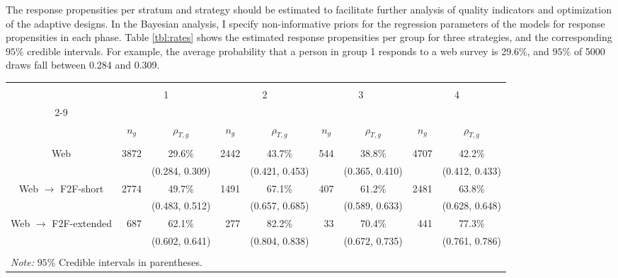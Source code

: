 \documentclass[11pt]{article}
\begin{document}
The response propensities per stratum and strategy should be estimated to facilitate further analysis of quality indicators and optimization of the adaptive designs. In the Bayesian analysis, I specify non-informative priors for the regression parameters of the models for response propensities in each phase. 
Table \ref{tbl:rates} shows the estimated response propensities per group for three strategies, and the corresponding $95\%$ credible intervals. For example, the average probability that a person in group 1 responds to a web survey is 29.6\%, and $95\%$ of 5000 draws fall between 0.284 and 0.309.

\begin{sidewaystable}
    \centering
    \caption{Estimated response propensities per stratum and strategy}
    \begin{tabular}{ccccccccc}
    \\ [-1.8ex] \hline
    \\[-1.8ex]
            & \multicolumn{2}{c}{1} & \multicolumn{2}{c}{2} & \multicolumn{2}{c}{3} & \multicolumn{2}{c}{4} \\
        \cline{2-9} \\ [-1.8ex]
        & $n_g$ & $\rho_{T,g}$ & $n_g$ & $\rho_{T,g}$ & $n_g$ & $\rho_{T,g}$ & $n_g$ & $\rho_{T,g}$ \\
        \hline \\[-1.8ex] 
        Web & \multicolumn{1}{r}{3872} & 29.6\% & \multicolumn{1}{r}{2442} & 43.7\% & \multicolumn{1}{r}{544} & 38.8\% & \multicolumn{1}{r}{4707} & 42.2\% \\
        & & (0.284, 0.309) & & (0.421, 0.453) & & (0.365, 0.410) & & (0.412, 0.433) \\
        Web $\rightarrow$ F2F-short & \multicolumn{1}{r}{2774} & 49.7\% & \multicolumn{1}{r}{1491} & 67.1\% & \multicolumn{1}{r}{407} & 61.2\% & \multicolumn{1}{r}{2481} & 63.8\% \\
        & & (0.483, 0.512) & & (0.657, 0.685) & & (0.589, 0.633) & & (0.628, 0.648) \\
        Web $\rightarrow$ F2F-extended & \multicolumn{1}{r}{687} & 62.1\% & \multicolumn{1}{r}{277} & 82.2\% & \multicolumn{1}{r}{33} & 70.4\% & \multicolumn{1}{r}{441} & 77.3\% \\
        & & (0.602, 0.641) & & (0.804, 0.838) & & (0.672, 0.735) & & (0.761, 0.786) \\
        \hline \\[-1.8ex]
    \multicolumn{9}{l}{\textit{Note:} $95\%$ Credible intervals in parentheses.}
    \end{tabular}
    \label{tbl:rates}
\end{sidewaystable}
\end{document}
